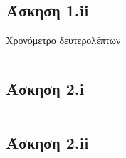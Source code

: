 \documentclass[a4paper,10pt]{article} \usepackage{anysize}
\begin{document}


\section*{} \setcounter{section}{1}
\subsection*{Άσκηση 1.ii}\setcounter{subsection}{1}
Χρονόμετρο δευτερολέπτων

\inputminted[linenos,obeytabs,fontsize=\footnotesize]{oldasm}{../askhsh_1_ii.8085}
\subsection*{Άσκηση 2.i}
\inputminted[linenos,obeytabs,fontsize=\footnotesize]{oldasm}{../askhsh_2_i.8085}
\subsection*{Άσκηση 2.ii}
\inputminted[linenos,obeytabs,fontsize=\footnotesize]{oldasm}{../askhsh_2_ii.8085}
\end{document}
